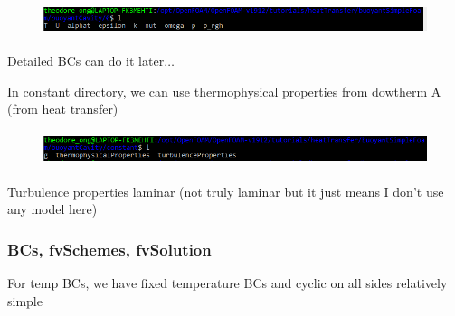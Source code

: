 \documentclass[12pt]{article}
\renewcommand{\_}{\kern-1.5pt\textunderscore\kern-1.5pt}
\begin{document}

\begin{figure}[H]
	\begin{Center}
		\includegraphics[width=6.27in,height=0.39in]{./media/image8.png}
	\end{Center}
\end{figure}



\par

Detailed BCs can do it later$ \ldots $ \par

In constant directory, we can use thermophysical properties from dowtherm A (from heat transfer)\par




\begin{figure}[H]
	\begin{Center}
		\includegraphics[width=6.27in,height=0.41in]{./media/image9.png}
	\end{Center}
\end{figure}



\par

Turbulence properties  laminar (not truly laminar but it just means I don’t use any model here)\par


\vspace{\baselineskip}
\subsubsection{BCs, fvSchemes, fvSolution}\par

For temp BCs, we have fixed temperature BCs and cyclic on all sides  relatively simple\par
\end{document}

